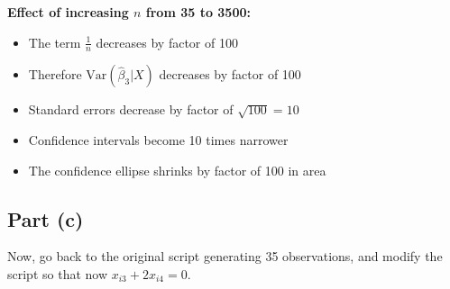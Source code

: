 \documentclass[12pt,a4paper]{article}
\begin{document}
\begin{enumerate}[label=(\roman*)]
\textbf{Effect of increasing $n$ from 35 to 3500:}
  \begin{itemize}
    \item The term $\frac{1}{n}$ decreases by factor of 100
    \item Therefore $\text{Var}(\hat{\beta}_3 | X)$ decreases by factor of 100
    \item Standard errors decrease by factor of $\sqrt{100} = 10$
    \item Confidence intervals become 10 times narrower
    \item The confidence ellipse shrinks by factor of 100 in area
\end{itemize}

\end{enumerate}

\subsection*{Part (c)}
Now, go back to the original script generating 35 observations, and modify the script so that now $x_{i3} + 2x_{i4} = 0$.
\end{document}

